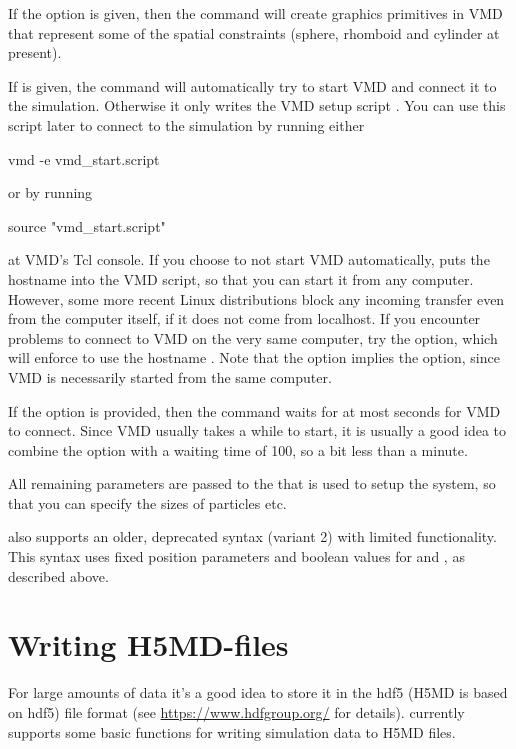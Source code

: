 If the option  is given, then the command will create
graphics primitives in VMD that represent some of the spatial
constraints (sphere, rhomboid and cylinder at present).

If  is given, the command will automatically try to start VMD and connect it to the \es{} simulation.  Otherwise it only writes the VMD
setup script . You can use this script later to connect to the \es{} simulation by running either
\begin{code}
  vmd -e vmd_start.script
\end{code}
or by running
\begin{code}
  source "vmd\_start.script"
\end{code}
at VMD's Tcl console. If you choose to not start VMD automatically,
 puts the hostname into the VMD script, so
that you can start it from any computer. However, some more recent Linux
distributions block any incoming transfer even from the computer itself,
if it does not come from localhost. If you encounter problems to connect
to VMD on the very same computer, try the  option, which
will enforce to use the hostname . Note that the  option implies the  option, since VMD is
necessarily started from the same computer.

If the option  is provided, then the command waits for at most
 seconds for VMD to connect. Since VMD usually takes a while
to start, it is usually a good idea to combine the  option with a waiting time of 100, so a bit less than a minute.

All remaining parameters are passed to the  that is used
to setup the system, so that you can specify the sizes of particles etc.

 also supports an older, deprecated syntax (variant 2) with limited functionality. This syntax uses fixed position
parameters and boolean values for  and , as
described above.

\section{Writing H5MD-files}
For large amounts of data it's a good idea to store it in the hdf5 (H5MD is
based on hdf5) file format
(see \url{https://www.hdfgroup.org/} for details). \es currently supports
some basic functions for writing simulation data to H5MD files.
